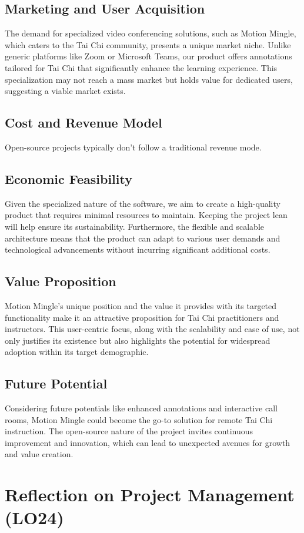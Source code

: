 \documentclass{article}
\begin{document}
\subsection{Marketing and User Acquisition}
The demand for specialized video conferencing solutions, such as Motion Mingle, which caters to the Tai Chi community, presents a unique market niche.
Unlike generic platforms like Zoom or Microsoft Teams, our product offers annotations tailored for Tai Chi that significantly enhance the learning experience. 
This specialization may not reach a mass market but holds value for dedicated users, suggesting a viable market exists.
\subsection{Cost and Revenue Model}
Open-source projects typically don't follow a traditional revenue mode.
\subsection{Economic Feasibility}
Given the specialized nature of the software, we aim to create a high-quality product that requires minimal resources to maintain. 
Keeping the project lean will help ensure its sustainability. Furthermore, the flexible and scalable architecture means that the product can adapt to various user demands and technological advancements without incurring significant additional costs.
\subsection{Value Proposition}
Motion Mingle's unique position and the value it provides with its targeted functionality make it an attractive proposition for Tai Chi practitioners and instructors. 
This user-centric focus, along with the scalability and ease of use, not only justifies its existence but also highlights the potential for widespread adoption within its target demographic. 
\subsection{Future Potential}
Considering future potentials like enhanced annotations and interactive call rooms, Motion Mingle could become the go-to solution for remote Tai Chi instruction. 
The open-source nature of the project invites continuous improvement and innovation, which can lead to unexpected avenues for growth and value creation.

\section{Reflection on Project Management (LO24)}
\end{document}

